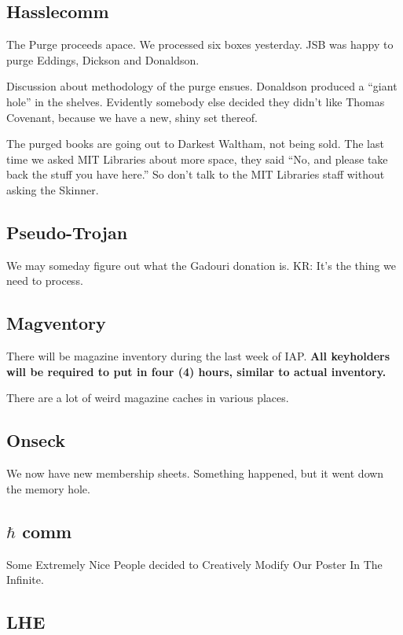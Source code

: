 \documentclass[10pt]{article}
\begin{document}
\subsection{Hasslecomm}

The Purge proceeds apace.  We processed six boxes yesterday.  JSB was happy to purge Eddings, Dickson and Donaldson.  

Discussion about methodology of the purge ensues.  Donaldson produced a ``giant hole'' in the shelves.  Evidently somebody else decided they didn't like Thomas Covenant, because we have a new, shiny set thereof. 

The purged books are going out to Darkest Waltham, not being sold.  The last time we asked MIT Libraries about more space, they said ``No, and please take back the stuff you have here.''  So don't talk to the MIT Libraries staff without asking the Skinner.

\subsection{Pseudo-Trojan}

We may someday figure out what the Gadouri donation is.  KR: It's the thing we need to process.

\subsection{Magventory}

There will be magazine inventory during the last week of IAP.  \textbf{All keyholders will be required to put in four (4) hours, similar to actual inventory.}

There are a lot of weird magazine caches in various places.

\subsection{Onseck}

We now have new membership sheets.  Something happened, but it went down the memory hole.

\subsection{$\hbar$ comm}

Some Extremely Nice People decided to Creatively Modify Our Poster In The Infinite.  

\subsection{LHE}
\end{document}
